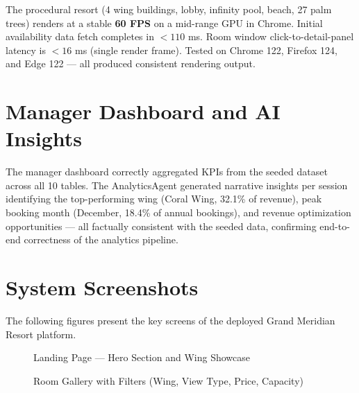 \documentclass[11pt,a4paper]{report}
\begin{document}
The procedural resort (4 wing buildings, lobby, infinity pool, beach, 27 palm trees) renders at a stable \textbf{60 FPS} on a mid-range GPU in Chrome. Initial availability data fetch completes in $< 110$ ms. Room window click-to-detail-panel latency is $< 16$ ms (single render frame). Tested on Chrome 122, Firefox 124, and Edge 122 — all produced consistent rendering output.

\section{Manager Dashboard and AI Insights}

The manager dashboard correctly aggregated KPIs from the seeded dataset across all 10 tables. The AnalyticsAgent generated narrative insights per session identifying the top-performing wing (Coral Wing, 32.1\% of revenue), peak booking month (December, 18.4\% of annual bookings), and revenue optimization opportunities — all factually consistent with the seeded data, confirming end-to-end correctness of the analytics pipeline.

\section{System Screenshots}

The following figures present the key screens of the deployed Grand Meridian Resort platform.

\begin{figure}[H]
\centering
\caption{Landing Page — Hero Section and Wing Showcase}
\label{fig:landing}
\end{figure}

\begin{figure}[H]
\centering
\caption{Room Gallery with Filters (Wing, View Type, Price, Capacity)}
\label{fig:room_gallery}
\end{figure}
\end{document}
